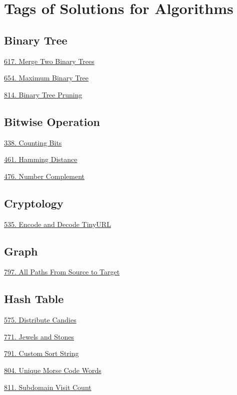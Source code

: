 \tocless\section{Tags of Solutions for Algorithms}
\label{sec:algo_tag}

\subsection*{Binary Tree}
\begin{flushleft}
    \hyperref[algo:617]{617. Merge Two Binary Trees}

    \hyperref[algo:654]{654. Maximum Binary Tree}

    \hyperref[algo:814]{814. Binary Tree Pruning}
\end{flushleft}

\subsection*{Bitwise Operation}
\begin{flushleft}
    \hyperref[algo:338]{338. Counting Bits}

    \hyperref[algo:461]{461. Hamming Distance}
    
    \hyperref[algo:476]{476. Number Complement}
\end{flushleft}

\subsection*{Cryptology}
\begin{flushleft}
    \hyperref[algo:535]{535. Encode and Decode TinyURL}
\end{flushleft}

\subsection*{Graph}
\begin{flushleft}
    \hyperref[algo:797]{797. All Paths From Source to Target}
\end{flushleft}

\subsection*{Hash Table}
\begin{flushleft}
    \hyperref[algo:575]{575. Distribute Candies}

    \hyperref[algo:771]{771. Jewels and Stones}
    
    \hyperref[algo:791]{791. Custom Sort String}
    
    \hyperref[algo:804]{804. Unique Morse Code Words}
    
    \hyperref[algo:811]{811. Subdomain Visit Count}
\end{flushleft}

